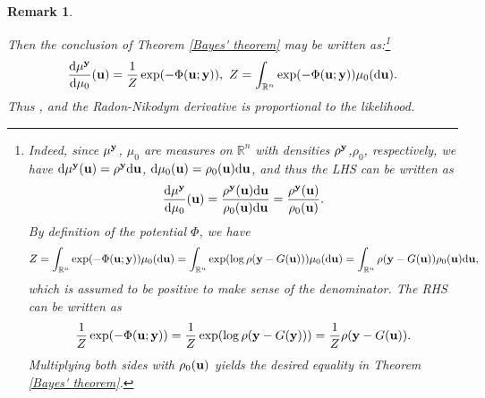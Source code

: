 \documentclass[oneside]{article}
\numberwithin{equation}{section}
\newtheorem{remark}{Remark}[section]
\begin{document}
\begin{remark}
\begin{itemize}
        Then the conclusion of Theorem \ref{Bayes' theorem} may be written as:\footnote{Indeed, since $\mu^{\bf y}$, $\mu_0$ are measures on $\mathbb{R}^n$ with densities $\rho^{\bf y}$,$ \rho_0$, respectively, we have ${\rm d}\mu^{\bf y}({\bf u}) = \rho^{\bf y}{\rm d}{\bf u}$, ${\rm d}\mu_0({\bf u}) = \rho_0({\bf u}){\rm d}{\bf u}$, and thus the LHS can be written as
        \begin{align*}
            \frac{{\rm d}\mu^{\bf y}}{{\rm d}\mu_0}({\bf u}) = \frac{\rho^{\bf y}({\bf u}){\rm d}{\bf u}}{\rho_0({\bf u}){\rm d}{\bf u}} = \frac{\rho^{\bf y}({\bf u})}{\rho_0({\bf u})}.
        \end{align*}
        By definition of the potential $\Phi$, we have
        \begin{align*}
            Z = \int_{\mathbb{R}^n} \exp(-\Phi({\bf u};{\bf y}))\mu_0({\rm d}{\bf u}) = \int_{\mathbb{R}^n} \exp(\log\rho({\bf y} - G({\bf u})))\mu_0({\rm d}{\bf u}) = \int_{\mathbb{R}^n} \rho({\bf y} - G({\bf u}))\rho_0({\bf u}){\rm d}{\bf u},
        \end{align*}
        which is assumed to be positive to make sense of the denominator. The RHS can be written as
        \begin{align*}
            \frac{1}{Z}\exp(-\Phi({\bf u};{\bf y})) = \frac{1}{Z}\exp(\log\rho({\bf y} - G({\bf y}))) = \frac{1}{Z}\rho({\bf y} - G({\bf u})).
        \end{align*}
        Multiplying both sides with $\rho_0({\bf u})$ yields the desired equality in Theorem \ref{Bayes' theorem}.}
        \begin{align*}
            \frac{{\rm d}\mu^{\bf y}}{{\rm d}\mu_0}({\bf u}) = \frac{1}{Z}\exp(-\Phi({\bf u};{\bf y})),\ Z = \int_{\mathbb{R}^n} \exp(-\Phi({\bf u};{\bf y}))\mu_0({\rm d}{\bf u}).
        \end{align*}
        Thus , and \emph{the Radon-Nikodym derivative is proportional to the likelihood}.
        

\end{itemize}
\end{remark}
\end{document}
